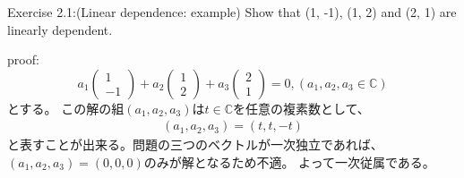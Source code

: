\begin{flushleft}
{\large Exercise 2.1:(Linear dependence: example) }
Show that (1, -1), (1, 2) and (2, 1) are linearly dependent.
\vspace{0.1in}

{\large proof:}
\begin{equation}
a_1\left(
	\begin{array}{c}
	1\\
	-1
	\end{array}
\right)
+ a_2\left(
	\begin{array}{c}
	1\\
	2
	\end{array}
\right)
+ a_3
\left(
	\begin{array}{c}
	2\\
	1
	\end{array}
\right)
= 0
, (a_1, a_2, a_3 \in \mathbb{C})
\end{equation}
とする。
\newline
この解の組$(a_1, a_2, a_3)$は$t\in \mathbb{C}$を任意の複素数として、
\begin{eqnarray}
(a_1, a_2, a_3) = (t, t, -t)
\end{eqnarray}
と表すことが出来る。問題の三つのベクトルが一次独立であれば、
$(a_1, a_2, a_3) = (0, 0, 0)$のみが解となるため不適。
よって一次従属である。
\end{flushleft}

